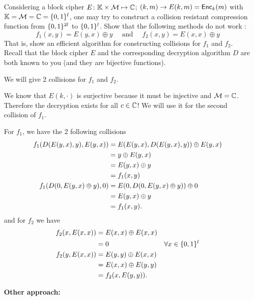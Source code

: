 Considering a block cipher
$E\colon\mathbb{K}\times\mathcal{M}\mapsto\mathbb{C}$; $(k,m)\rightarrow E(k,m)=\operatorname{\mathsf{Enc}}_k(m)$
with $\mathbb{K}=\mathcal{M}=\mathbb{C}=\{0, 1\}^l$, one may try to construct
a collision resistant compression function from $\{0, 1\}^{2l}$ to $\{0, 1\}^{l}$.
Show that the following methods do not work :
\[ f_1(x,y)=E(y,x)\oplus y \quad\text{ and }\quad f_2(x,y)=E(x,x)\oplus y \]
That is, show an efficient algorithm for constructing collisions for $f_1$ and $f_2$.
Recall that the block cipher $E$ and the corresponding decryption algorithm $D$ are both
known to you (and they are bijective functions).


\begin{solution}
	We will give 2 collisions for $f_1$ and $f_2$.

	We know that $E(k, \cdot)$ is surjective because it must be injective and $\mathcal{M} = \mathbb{C}$.
	Therefore the decryption exists for all $c \in \mathbb{C}$! We will use it for the second collision of $f_1$.

	For $f_1$, we have the 2 following collisions
	\begin{align*}
	f_1(D(E(y,x),y), E(y,x))
	& = E(E(y,x), D(E(y,x), y)) \oplus E(y,x)\\
	& = y \oplus E(y,x)\\
	& = E(y,x) \oplus y\\
	& = f_1(x, y)\\
	f_1(D(0, E(y,x) \oplus y), 0)
	& = E(0, D(0, E(y, x) \oplus y)) \oplus 0\\
	& = E(y, x) \oplus y\\
	& = f_1(x, y).
	\end{align*}
	and for $f_2$ we have
	\begin{align*}
	f_2(x, E(x,x)) & = E(x,x) \oplus E(x,x)\\
	& = 0 & \forall x \in \{0,1\}^l\\
	f_2(y, E(x,x)) & = E(y,y) \oplus E(x,x)\\
	& = E(x,x) \oplus E(y,y)\\
	& = f_2(x, E(y,y)).
	\end{align*}

	\textbf{Other approach:}


\end{solution}
